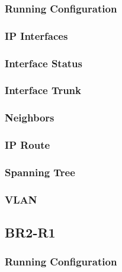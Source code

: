 \subsubsection{Running Configuration}


\subsubsection{IP Interfaces}


\subsubsection{Interface Status}


\subsubsection{Interface Trunk}


\subsubsection{Neighbors}


\subsubsection{IP Route}


\subsubsection{Spanning Tree}


\subsubsection{VLAN}





\subsection{BR2-R1}
\subsubsection{Running Configuration}


